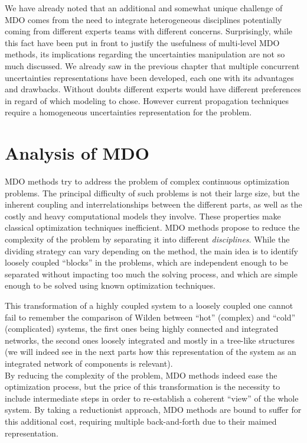 We have already noted that an additional and somewhat unique challenge of MDO comes from the need to integrate heterogeneous disciplines potentially coming from different experts teams with different concerns. Surprisingly, while this fact have been put in front to justify the usefulness of multi-level MDO methods, its implications regarding the uncertainties manipulation are not so much discussed. We already saw in the previous chapter that multiple concurrent uncertainties representations have been developed, each one with its advantages and drawbacks. Without doubts different experts would have different preferences in regard of which modeling to chose. However current propagation techniques require a homogeneous uncertainties representation for the problem.

\section{Analysis of MDO}

MDO methods try to address the problem of complex continuous optimization problems. The principal difficulty of such problems is not their large size, but the inherent coupling and interrelationships between the different parts, as well as the costly and heavy computational models they involve. These properties make classical optimization techniques inefficient. MDO methods propose to reduce the complexity of the problem by separating it into different \emph{disciplines}. While the dividing strategy can vary depending on the method, the main idea is to identify loosely coupled \enquote{blocks} in the problems, which are independent enough to be separated without impacting too much the solving process, and which are simple enough to be solved using known optimization techniques.

This transformation of a highly coupled system to a loosely coupled one cannot fail to remember the comparison of Wilden \cite{wilden2003system} between \enquote{hot} (complex) and \enquote{cold} (complicated) systems, the first ones being highly connected and integrated networks, the second ones loosely integrated and mostly in a tree-like structures (we will indeed see in the next parts how this representation of the system as an integrated network of components is relevant).\\
By reducing the complexity of the problem, MDO methods indeed ease the optimization process, but the price of this transformation is the necessity to include intermediate steps in order to re-establish a coherent \enquote{view} of the whole system. By taking a reductionist approach, MDO methods are bound to suffer for this additional cost, requiring multiple back-and-forth due to their maimed representation.

